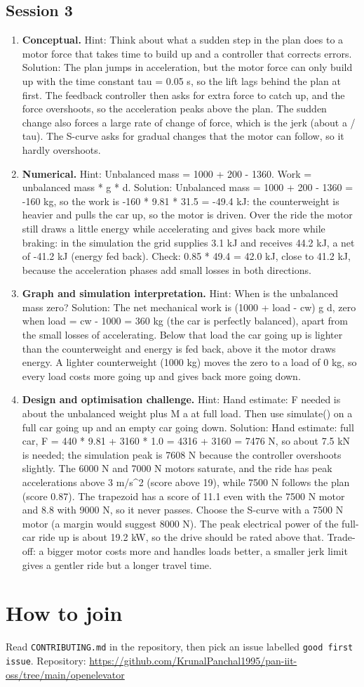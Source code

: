 \documentclass[11pt,a4paper]{article}
\begin{document}
\subsection*{Session 3}
\begin{enumerate}[nosep]
\item \textbf{Conceptual.} Hint: Think about what a sudden step in the plan does to a motor force that takes time to build up and a controller that corrects errors. Solution: The plan jumps in acceleration, but the motor force can only build up with the time constant tau = 0.05 s, so the lift lags behind the plan at first. The feedback controller then asks for extra force to catch up, and the force overshoots, so the acceleration peaks above the plan. The sudden change also forces a large rate of change of force, which is the jerk (about a / tau). The S-curve asks for gradual changes that the motor can follow, so it hardly overshoots.
\item \textbf{Numerical.} Hint: Unbalanced mass = 1000 + 200 - 1360. Work = unbalanced mass * g * d. Solution: Unbalanced mass = 1000 + 200 - 1360 = -160 kg, so the work is -160 * 9.81 * 31.5 = -49.4 kJ: the counterweight is heavier and pulls the car up, so the motor is driven. Over the ride the motor still draws a little energy while accelerating and gives back more while braking: in the simulation the grid supplies 3.1 kJ and receives 44.2 kJ, a net of -41.2 kJ (energy fed back). Check: 0.85 * 49.4 = 42.0 kJ, close to 41.2 kJ, because the acceleration phases add small losses in both directions.
\item \textbf{Graph and simulation interpretation.} Hint: When is the unbalanced mass zero? Solution: The net mechanical work is (1000 + load - cw) g d, zero when load = cw - 1000 = 360 kg (the car is perfectly balanced), apart from the small losses of accelerating. Below that load the car going up is lighter than the counterweight and energy is fed back, above it the motor draws energy. A lighter counterweight (1000 kg) moves the zero to a load of 0 kg, so every load costs more going up and gives back more going down.
\item \textbf{Design and optimisation challenge.} Hint: Hand estimate: F needed is about the unbalanced weight plus M a at full load. Then use simulate() on a full car going up and an empty car going down. Solution: Hand estimate: full car, F = 440 * 9.81 + 3160 * 1.0 = 4316 + 3160 = 7476 N, so about 7.5 kN is needed; the simulation peak is 7608 N because the controller overshoots slightly. The 6000 N and 7000 N motors saturate, and the ride has peak accelerations above 3 m/s\textasciicircum{}2 (score above 19), while 7500 N follows the plan (score 0.87). The trapezoid has a score of 11.1 even with the 7500 N motor and 8.8 with 9000 N, so it never passes. Choose the S-curve with a 7500 N motor (a margin would suggest 8000 N). The peak electrical power of the full-car ride up is about 19.2 kW, so the drive should be rated above that. Trade-off: a bigger motor costs more and handles loads better, a smaller jerk limit gives a gentler ride but a longer travel time.
\end{enumerate}

\section{How to join}
Read \texttt{CONTRIBUTING.md} in the repository, then pick an issue labelled \texttt{good first issue}. Repository: \url{https://github.com/KrunalPanchal1995/pan-iit-oss/tree/main/openelevator}
\end{document}
